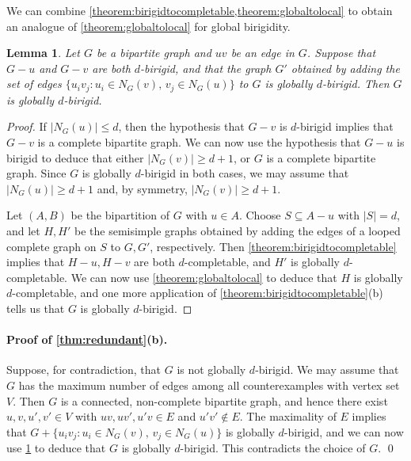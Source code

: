 \documentclass[11pt,a4paper,dvipsnames]{scrartcl}
\newtheorem{lemma}[theorem]{Lemma}
\begin{document}
We can combine \cref{theorem:birigidtocompletable,theorem:globaltolocal} to obtain an analogue of \cref{theorem:globaltolocal} for global birigidity.

\begin{lemma}
    \label{lem:glob_birigid_v2}
    Let $G$ be a bipartite graph and $uv$ be an edge in $G$.  
    Suppose that $G-u$ and $G-v$ are both $d$-birigid, and that the graph $G'$ obtained by adding the set of edges 
    $\{u_iv_j : u_i \in N_G(v),\, v_j \in N_G(u)\}$  to $G$ is globally $d$-birigid. Then $G$ is globally $d$-birigid.
 \end{lemma}
\begin{proof}
If $|N_G(u)|\leq d$, then the hypothesis that $G-v$ is $d$-birigid implies that $G-v$ is a complete bipartite graph. We can now use the hypothesis that $G-u$ is birigid to deduce that either $|N_G(v)|\geq d+1$,  or $G$ is a complete bipartite graph. Since $G$ is globally $d$-birigid in both cases, we may assume that $|N_G(u)|\geq d+1$  and, by symmetry, $|N_G(v)|\geq d+1$. 

Let $(A,B)$ be the bipartition of $G$ with $u\in A$. Choose $S\subseteq A-u$ with $|S|=d$, and let $H,H'$ be the semisimple graphs obtained by adding the edges of a looped complete graph on $S$ to $G,G'$, respectively. Then 
\cref{theorem:birigidtocompletable} implies that $H-u,H-v$ are both $d$-completable, and $H'$ is globally $d$-completable. We can now use \cref{theorem:globaltolocal} to deduce that $H$ is globally $d$-completable, and one more application of 
\cref{theorem:birigidtocompletable}(b) tells us  that $G$  is globally $d$-birigid.
\end{proof}

\paragraph*{Proof of \cref{thm:redundant}(b).}  \hspace{-1em}
    Suppose, for contradiction, that $G$ is not globally $d$-birigid. We may assume that $G$ has the maximum number of edges among all counterexamples  with vertex set $V$. Then $G$ is a connected, non-complete bipartite graph, and hence there exist $u,v,u',v'\in V$ with $uv, uv', u'v\in E$ and $u'v'\notin E$. The maximality of $E$ implies that $G+\{u_iv_j : u_i \in N_G(v),\, v_j \in N_G(u)\}$ is globally $d$-birigid, and we can now use
     \cref{lem:glob_birigid_v2} to deduce that $G$ is globally $d$-birigid. This contradicts the choice of $G$.
\qed
\end{document}
